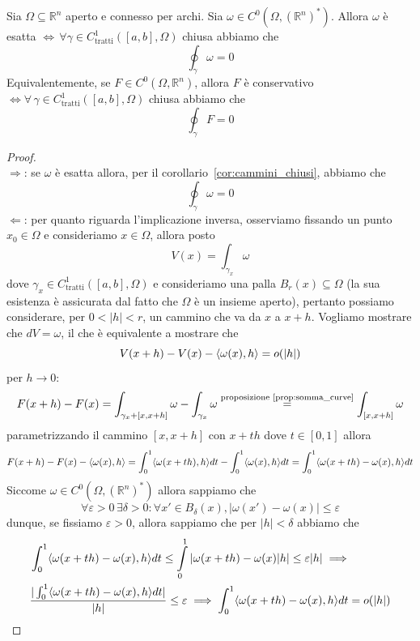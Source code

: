 \begin{theorem}[teorema CF1]
Sia $\Omega \subseteq \mathbb{R}^n$ aperto e connesso per archi. Sia $\omega \in C^0(\Omega, (\mathbb{R}^n)^*)$. Allora $\omega$ è esatta $\iff \, \forall \gamma \in C^1_\text{tratti} ([a, b], \Omega)$ chiusa abbiamo che
$$
\oint_\gamma \omega = 0
$$
Equivalentemente, se $F \in C^0(\Omega, \mathbb{R}^n)$, allora $F$ è conservativo $\iff \forall \, \gamma \in C^1_\text{tratti}([a, b], \Omega)$ chiusa abbiamo che
$$
\oint_\gamma F = 0
$$
\label{thm:teo_cf1}
\end{theorem}
\begin{proof} \hspace{1cm} \\
$\boxed{\Rightarrow}$: se $\omega$ è esatta allora, per il corollario~\ref{cor:cammini_chiusi}, abbiamo che
$$
\oint_\gamma \omega = 0
$$
$\boxed{\Leftarrow}$: per quanto riguarda l'implicazione inversa, osserviamo fissando un punto $x_0 \in \Omega$ e consideriamo $x \in \Omega$, allora posto
$$
V(x) = \int_{\gamma_x} \omega
$$
dove $\gamma_x \in C^1_\text{tratti}([a, b], \Omega)$ e consideriamo una palla $B_r(x) \subseteq \Omega$ (la sua esistenza è assicurata dal fatto che $\Omega$ è un insieme aperto), pertanto possiamo considerare, per $0 < |h| < r$, un cammino che va da $x$ a $x+h$. Vogliamo mostrare che $dV =\omega$, il che è equivalente a mostrare che $$V(x+h) - V(x) - \langle \omega(x), h \rangle = o(|h|)$$ per $h \to 0$:
$$
F(x+h) - F(x) = \int_{\gamma_x + [x, x+h]} \omega - \int_{\gamma_x} \omega \stackrel{\text{proposizione~\ref{prop:somma_curve}}}{=} \int_{[x, x+h]} \omega
$$
parametrizzando il cammino $[x, x+h]$ con $x + th$ dove $t \in [0,1]$ allora
$$
F(x+h)-F(x) - \langle \omega(x), h \rangle = \int_0^1 \langle \omega(x + th), h \rangle dt - \int_0^1 \langle \omega(x), h \rangle dt = \int_0^1 \langle \omega(x + th) - \omega(x), h \rangle dt
$$
Siccome $\omega \in C^0(\Omega, (\mathbb{R}^n)^*)$ allora sappiamo che
$$
\forall \varepsilon > 0 \, \exists \delta > 0: \forall x' \in B_\delta(x), |\omega(x') - \omega(x)| \leq \varepsilon
$$
dunque, se fissiamo $\varepsilon > 0$, allora sappiamo che per $|h| < \delta$ abbiamo che
\begin{align*}
&\int_0^1 \langle \omega(x + th) - \omega(x), h \rangle dt \leq \int\limits_0^1 |\omega(x + th) - \omega(x)|h| \leq \varepsilon |h| \implies \\
&\frac{|\int_0^1 \langle \omega(x + th) - \omega(x), h \rangle dt|}{|h|} \leq \varepsilon \implies \int_0^1 \langle \omega(x + th) - \omega(x), h \rangle dt = o(|h|) 
\end{align*}

\end{proof}
